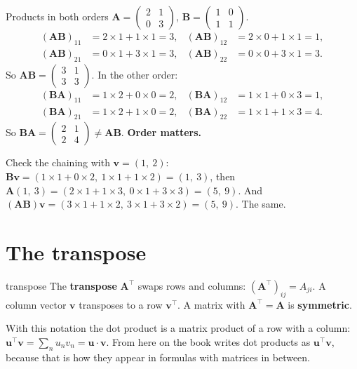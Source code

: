 \documentclass[11pt,a4paper,oneside,openany]{book}
\newcommand{\B}[1]{{\symbf{#1}}}
\newcommand{\B}[1]{{\bm{#1}}}
\newcommand{\T}{^{\top}}
\newcommand{\vu}{\B{u}}
\newcommand{\vv}{\B{v}}
\newcommand{\mA}{\B{A}}
\newcommand{\mB}{\B{B}}
\begin{document}
\begin{worked}[label=we:matmul]{Products in both orders}
$\mA=\begin{pmatrix}2&1\\0&3\end{pmatrix}$, $\mB=\begin{pmatrix}1&0\\1&1\end{pmatrix}$.
\begin{align*}
(\mA\mB)_{11} &= 2\times1+1\times1=3, & (\mA\mB)_{12}&=2\times0+1\times1=1,\\
(\mA\mB)_{21} &= 0\times1+3\times1=3, & (\mA\mB)_{22}&=0\times0+3\times1=3.
\end{align*}
So $\mA\mB=\begin{pmatrix}3&1\\3&3\end{pmatrix}$. In the other order:
\begin{align*}
(\mB\mA)_{11} &= 1\times2+0\times0=2, & (\mB\mA)_{12}&=1\times1+0\times3=1,\\
(\mB\mA)_{21} &= 1\times2+1\times0=2, & (\mB\mA)_{22}&=1\times1+1\times3=4.
\end{align*}
So $\mB\mA=\begin{pmatrix}2&1\\2&4\end{pmatrix}\neq\mA\mB$. \textbf{Order matters.}

Check the chaining with $\vv=(1,\ 2)$: $\mB\vv=(1\times1+0\times2,\ 1\times1+1\times2)=(1,\ 3)$, then
$\mA(1,\ 3)=(2\times1+1\times3,\ 0\times1+3\times3)=(5,\ 9)$. And $(\mA\mB)\vv=(3\times1+1\times2,\ 3\times1+3\times2)=(5,\ 9)$.
The same.
\end{worked}

\section{The transpose}

\begin{defn}{transpose}
The \textbf{transpose} $\mA\T$ swaps rows and columns: $(\mA\T)_{ij}=A_{ji}$. A column vector $\vv$ transposes to a row
$\vv\T$. A matrix with $\mA\T=\mA$ is \textbf{symmetric}.
\end{defn}

With this notation the dot product is a matrix product of a row with a column: $\vu\T\vv=\sum_n u_nv_n=\vu\cdot\vv$. From
here on the book writes dot products as $\vu\T\vv$, because that is how they appear in formulas with matrices in between.
\end{document}
